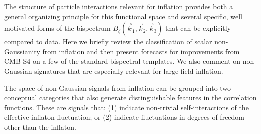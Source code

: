The structure of particle interactions relevant for inflation provides both a general organizing principle for this functional space and several specific, well motivated forms of the bispectrum $B_{\zeta}(\vec{k}_1,\vec{k}_2,\vec{k}_3)$ that can be explicitly compared to data. Here we briefly review the classification of scalar non-Gaussianity from inflation and then present forecasts for improvements from CMB-S4 on a few of the standard bispectral templates. We also comment on non-Gaussian signatures that are especially relevant for large-field inflation.

The space of non-Gaussian signals from inflation can be grouped into two conceptual categories that also generate distinguishable features in the correlation functions. These are signals that: (1) indicate non-trivial self-interactions of the effective inflaton fluctuation; or (2) indicate fluctuations in degrees of freedom other than the inflaton. 

